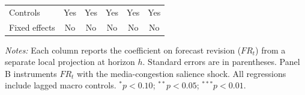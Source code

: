 \begin{table}[htbp]
\begin{threeparttable}
{\begin{tabular}{lccccc}
\addlinespace
Controls & Yes & Yes & Yes & Yes & Yes \\
Fixed effects & No & No & No & No & No \\
\bottomrule
\end{tabular}
}
\begin{tablenotes}[flushleft]
\footnotesize
\item \textit{Notes:} Each column reports the coefficient on forecast revision ($FR_t$) from a separate local projection at horizon $h$. Standard errors are in parentheses. Panel B instruments $FR_t$ with the media-congestion salience shock. All regressions include lagged macro controls. $^{*}p<0.10$; $^{**}p<0.05$; $^{***}p<0.01$.
\end{tablenotes}
\end{threeparttable}
\end{table}
